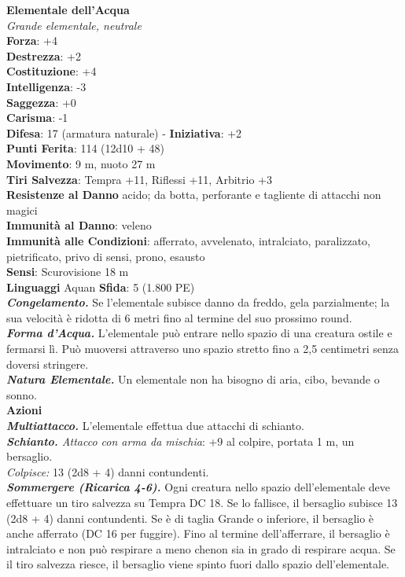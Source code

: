 \begin{multicols}{2}
\medskip\textbf{Elementale dell'Acqua}\\
\emph{Grande elementale, neutrale}\\
\textbf{Forza}: +4\\
\textbf{Destrezza}: +2\\
\textbf{Costituzione}: +4\\
\textbf{Intelligenza}: -3\\
\textbf{Saggezza}: +0\\
\textbf{Carisma}: -1\\
\textbf{Difesa}: 17 (armatura naturale) - \textbf{Iniziativa}: +2\\
\textbf{Punti Ferita}: 114 (12d10 + 48)\\
\textbf{Movimento}: 9 m, nuoto 27 m\\
\textbf{Tiri Salvezza}: Tempra +11, Riflessi +11, Arbitrio +3\\
\textbf{Resistenze al Danno} acido; da botta, perforante e tagliente di attacchi non magici\\
\textbf{Immunità al Danno}: veleno\\
\textbf{Immunità alle Condizioni}: afferrato, avvelenato, intralciato, paralizzato, pietrificato, privo di sensi, prono, esausto\\
\textbf{Sensi}: Scurovisione 18 m\\
\textbf{Linguaggi} Aquan
\textbf{Sfida}: 5 (1.800 PE)\smallskip\\
\emph{\textbf{Congelamento.}} Se l'elementale subisce danno da freddo, gela parzialmente; la sua velocità è ridotta di 6 metri fino al termine del suo prossimo round.\\
\emph{\textbf{Forma d'Acqua.}} L'elementale può entrare nello spazio di una creatura ostile e fermarsi lì. Può muoversi attraverso uno spazio stretto fino a 2,5 centimetri senza doversi stringere.\\
\emph{\textbf{Natura Elementale.}} Un elementale non ha bisogno di aria, cibo, bevande o sonno.\\
\smallskip\textbf{Azioni}\\
\emph{\textbf{Multiattacco.}} L'elementale effettua due attacchi di schianto.\\
\emph{\textbf{Schianto.} Attacco con arma da mischia}: +9 al colpire, portata 1 m, un bersaglio.\\
\emph{Colpisce:} 13 (2d8 + 4) danni contundenti.\\
\emph{\textbf{Sommergere (Ricarica 4-6).}} Ogni creatura nello spazio dell'elementale deve effettuare un tiro salvezza su Tempra DC  18. Se lo fallisce, il bersaglio subisce 13 (2d8 + 4) danni contundenti. Se è di taglia Grande o inferiore, il bersaglio è anche afferrato (DC  16 per fuggire). Fino al termine dell'afferrare, il bersaglio è intralciato e non può respirare a meno chenon sia in grado di respirare acqua. Se il  tiro salvezza riesce, il bersaglio viene spinto fuori dallo spazio dell'elementale.\\

\end{multicols}
